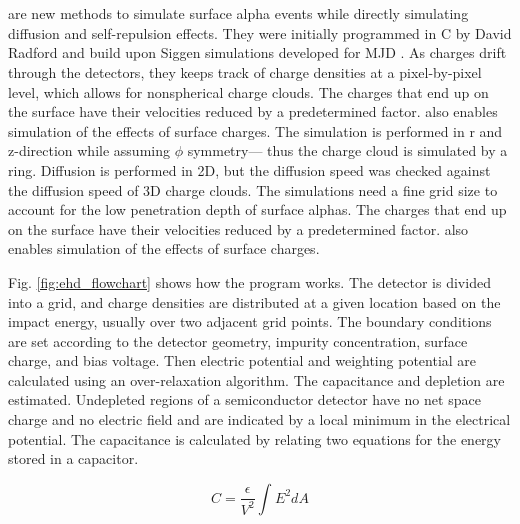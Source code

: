 

\section{{\tdsim}}

{\tdsim} are new methods to simulate surface alpha events while directly simulating diffusion and self-repulsion effects. They were initially programmed in C by David Radford and build upon Siggen simulations developed for MJD \cite{siggen_paper}. As charges drift through the detectors, they keeps track of charge densities at a pixel-by-pixel level, which allows for nonspherical charge clouds. The charges that end up on the surface have their velocities reduced by a predetermined factor. {\tdsim} also enables simulation of the effects of surface charges. The simulation is performed in r and z-direction while assuming $\phi$ symmetry— thus the charge cloud is simulated by a ring. Diffusion is performed in 2D, but the diffusion speed was checked against the diffusion speed of 3D charge clouds. The simulations need a fine grid size to account for the low penetration depth of surface alphas. The charges that end up on the surface have their velocities reduced by a predetermined factor. {\tdsim} also enables simulation of the effects of surface charges.


Fig. \ref{fig:ehd_flowchart} shows how the {\tdsim} program works. The detector is divided into a grid, and charge densities are distributed at a given location based on the impact energy, usually over two adjacent grid points. The boundary conditions are set according to the detector geometry, impurity concentration, surface charge, and bias voltage. Then electric potential and weighting potential are calculated using an over-relaxation algorithm. The capacitance and depletion are estimated. Undepleted regions of a semiconductor detector have no net space charge and no electric field and are indicated by a local minimum in the electrical potential. The capacitance is calculated by relating two equations for the energy stored in a capacitor.

\begin{equation}\label{capacitance_eq}
C= \frac{\epsilon}{V^2} \int_{}^{} E^2 dA
\end{equation}


